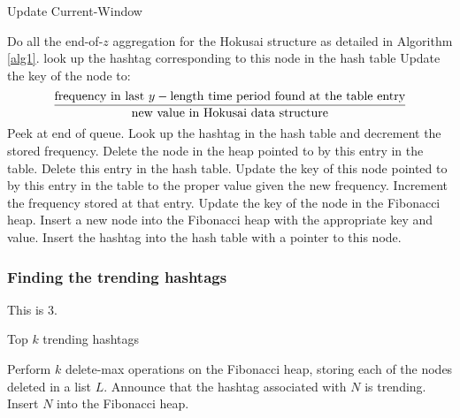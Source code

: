 \documentclass[twoside]{article}
\begin{document}
\begin{algorithm}
\caption{Update Current-Window}\label{alg2}
\begin{algorithmic}[1]
		\State Do all the end-of-$z$ aggregation for the Hokusai structure as detailed in Algorithm \ref{alg1}.
			\State look up the hashtag corresponding to this node in the hash table
			\State Update the key of the node to: \[\frac{\textnormal{frequency in last } y-\textnormal{length time period found at the table entry}}{\textnormal{new value in Hokusai data structure}}\]
		\EndFor
	\EndIf
		\State Peek at end of queue.
			\State Look up the hashtag in the hash table and decrement the stored frequency.
				\State Delete the node in the heap pointed to by this entry in the table.
				\State Delete this entry in the hash table.
			\Else	
				\State Update the key of this node pointed to by this entry in the table to the proper value given the new frequency.
			\EndIf
		\EndIf
	\EndIf
		\State Increment the frequency stored at that entry.
		\State Update the key of the node in the Fibonacci heap.
	\Else
		\State Insert a new node into the Fibonacci heap with the appropriate key and value. 
		\State Insert the hashtag into the hash table with a pointer to this node.
 	\EndIf
\EndWhile
\end{algorithmic}
\end{algorithm}

\subsubsection{Finding the trending hashtags}

This is 3.

\begin{algorithm}
\caption{Top $k$ trending hashtags} \label{alg3}
\begin{algorithmic}[1]
\State Perform $k$ delete-max operations on the Fibonacci heap, storing each of the nodes deleted in a list $L$.
	\State Announce that the hashtag associated with $N$ is trending.
	\State Insert $N$ into the Fibonacci heap.
\EndFor
\end{algorithmic}
\end{algorithm}


\end{document}
